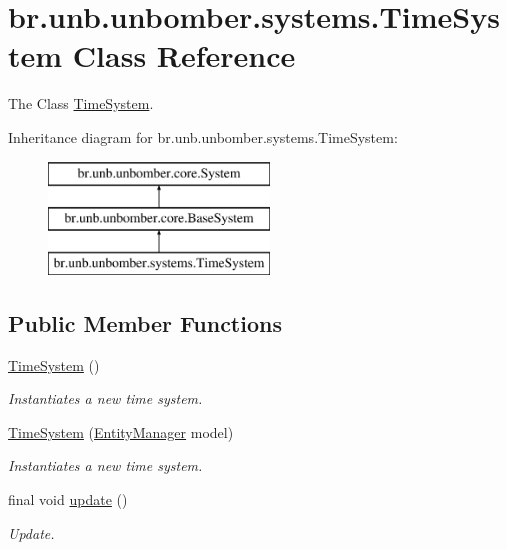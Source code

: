 \hypertarget{classbr_1_1unb_1_1unbomber_1_1systems_1_1_time_system}{\section{br.\+unb.\+unbomber.\+systems.\+Time\+System Class Reference}
\label{classbr_1_1unb_1_1unbomber_1_1systems_1_1_time_system}
}


The Class \hyperlink{classbr_1_1unb_1_1unbomber_1_1systems_1_1_time_system}{Time\+System}.  


Inheritance diagram for br.\+unb.\+unbomber.\+systems.\+Time\+System\+:\begin{figure}[H]
\begin{center}
\leavevmode
\includegraphics[height=3.000000cm]{classbr_1_1unb_1_1unbomber_1_1systems_1_1_time_system}
\end{center}
\end{figure}
\subsection*{Public Member Functions}
\begin{DoxyCompactItemize}
\item 
\hyperlink{classbr_1_1unb_1_1unbomber_1_1systems_1_1_time_system_a825a265470d1a8dc3ae1d844f8ef89cf}{Time\+System} ()
\begin{DoxyCompactList}\small\item\em Instantiates a new time system. \end{DoxyCompactList}\item 
\hyperlink{classbr_1_1unb_1_1unbomber_1_1systems_1_1_time_system_a90615ccf4a2ed1a327d0734c48c71715}{Time\+System} (\hyperlink{interfacebr_1_1unb_1_1unbomber_1_1core_1_1_entity_manager}{Entity\+Manager} model)
\begin{DoxyCompactList}\small\item\em Instantiates a new time system. \end{DoxyCompactList}\item 
final void \hyperlink{classbr_1_1unb_1_1unbomber_1_1systems_1_1_time_system_a3c7dbe08d7fee626ede56a5825a9289c}{update} ()
\begin{DoxyCompactList}\small\item\em Update. \end{DoxyCompactList}\end{DoxyCompactItemize}
